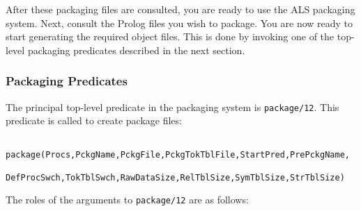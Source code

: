 After these packaging files are consulted, you are ready to use the
ALS packaging system.   Next, consult the Prolog files you wish to package.  You are now
ready to start generating the required object files.  This is done by invoking one of the
top-level packaging predicates described in the next section.

\subsubsection{Packaging Predicates}

The principal top-level predicate in the packaging system is \verb|package/12|.
This predicate is called to create package files:

\begin{verbatim}
    package(Procs,PckgName,PckgFile,PckgTokTblFile,StartPred,PrePckgName,
            DefProcSwch,TokTblSwch,RawDataSize,RelTblSize,SymTblSize,StrTblSize)
\end{verbatim}

The roles of the arguments to \verb|package/12| are as follows:

